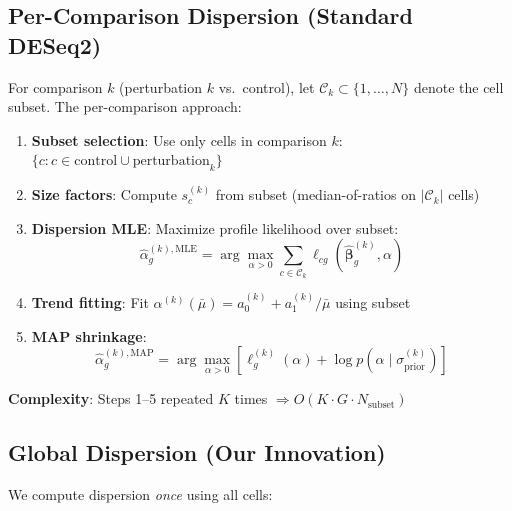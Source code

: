 \documentclass[11pt]{article}
\theoremstyle{definition}
\theoremstyle{remark}
\begin{document}
\subsection{Per-Comparison Dispersion (Standard DESeq2)}

For comparison $k$ (perturbation $k$ vs.\ control), let $\mathcal{C}_k \subset \{1, \ldots, N\}$ denote the cell subset. The per-comparison approach:

\begin{enumerate}
    \item \textbf{Subset selection}: Use only cells in comparison $k$: $\{c : c \in \text{control} \cup \text{perturbation}_k\}$
    
    \item \textbf{Size factors}: Compute $s_c^{(k)}$ from subset (median-of-ratios on $|\mathcal{C}_k|$ cells)
    
    \item \textbf{Dispersion MLE}: Maximize profile likelihood over subset:
    \begin{equation}
    \hat{\alpha}_g^{(k),\text{MLE}} = \arg\max_{\alpha > 0} \sum_{c \in \mathcal{C}_k} \ell_{cg}(\hat{\boldsymbol{\beta}}_g^{(k)}, \alpha)
    \end{equation}
    
    \item \textbf{Trend fitting}: Fit $\alpha^{(k)}(\bar{\mu}) = a_0^{(k)} + a_1^{(k)} / \bar{\mu}$ using subset
    
    \item \textbf{MAP shrinkage}: 
    \begin{equation}
    \hat{\alpha}_g^{(k),\text{MAP}} = \arg\max_{\alpha > 0} \left[ \ell_g^{(k)}(\alpha) + \log p(\alpha \mid \sigma_{\text{prior}}^{(k)}) \right]
    \end{equation}
\end{enumerate}

\textbf{Complexity}: Steps 1--5 repeated $K$ times $\Rightarrow O(K \cdot G \cdot N_{\text{subset}})$

\subsection{Global Dispersion (Our Innovation)}

We compute dispersion \emph{once} using all cells:
\end{document}
